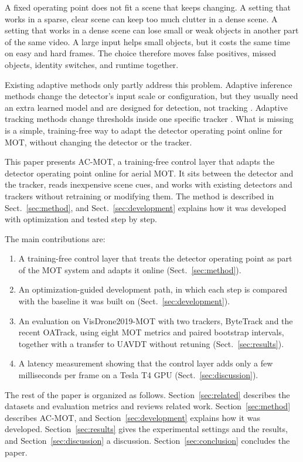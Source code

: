 \documentclass[pdflatex,sn-mathphys-num,iicol]{sn-jnl}
\begin{document}
A fixed operating point does not fit a scene that keeps changing. A setting
that works in a sparse, clear scene can keep too much clutter in a dense
scene. A setting that works in a dense scene can lose small or weak objects in
another part of the same video. A large input helps small objects, but it
costs the same time on easy and hard frames. The choice therefore moves false
positives, missed objects, identity switches, and runtime together.

Existing adaptive methods only partly address this problem. Adaptive inference
methods change the detector's input scale or configuration, but they usually
need an extra learned model and are designed for detection, not tracking
\cite{chin2019adascale,xu2020approxdet}. Adaptive tracking methods change
thresholds inside one specific tracker \cite{ma2023adaptivebytetrack,shim2024adaptrack}.
What is missing is a simple, training-free way to adapt the detector
operating point online for MOT, without changing the detector or the tracker.

This paper presents AC-MOT, a training-free control layer that adapts the
detector operating point online for aerial MOT. It sits between the detector
and the tracker, reads inexpensive scene cues, and works with existing
detectors and trackers without retraining or modifying them. The method is
described in Sect.~\ref{sec:method}, and Sect.~\ref{sec:development} explains
how it was developed with optimization and tested step by step.

The main contributions are:
\begin{enumerate}
\item A training-free control layer that treats the detector operating point
      as part of the MOT system and adapts it online (Sect.~\ref{sec:method}).
\item An optimization-guided development path, in which each step is compared
      with the baseline it was built on (Sect.~\ref{sec:development}).
\item An evaluation on VisDrone2019-MOT with two trackers, ByteTrack and the
      recent OATrack, using eight MOT metrics and paired bootstrap intervals,
      together with a transfer to UAVDT without retuning
      (Sect.~\ref{sec:results}).
\item A latency measurement showing that the control layer adds only a few
      milliseconds per frame on a Tesla T4 GPU (Sect.~\ref{sec:discussion}).
\end{enumerate}

The rest of the paper is organized as follows. Section~\ref{sec:related}
describes the datasets and evaluation metrics and reviews related work. Section~\ref{sec:method} describes AC-MOT, and
Section~\ref{sec:development} explains how it was developed.
Section~\ref{sec:results} gives the experimental settings and the results,
and Section~\ref{sec:discussion} a discussion. Section~\ref{sec:conclusion} concludes the paper.
\end{document}
